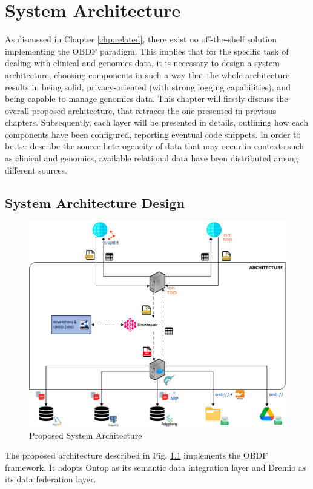 
\chapter{System Architecture}
\label{chp:architecture}

As discussed in Chapter \ref{chp:related}, there exist no off-the-shelf solution implementing the \ac{OBDF} paradigm. This implies that for the specific task of dealing with clinical and genomics data, it is necessary to design a system architecture, choosing components in such a way that the whole architecture results in being solid, privacy-oriented (with strong logging capabilities), and being capable to manage genomics data.
This chapter will firstly discuss the overall proposed architecture, that retraces the one presented in previous chapters. Subsequently, each layer will be presented in details, outlining how each components have been configured, reporting eventual code snippets. In order to better describe the source heterogeneity of data that may occur in contexts such as clinical and genomics, available relational data have been distributed among different sources.

\section{System Architecture Design}
\begin{figure}[ht]
    \centering
    \includegraphics[width=15cm]{res/Drawing1.png}
    \caption{Proposed System Architecture}
    \label{fig:mirco_arch}
\end{figure}
The proposed architecture described in Fig. \ref{fig:mirco_arch} implements the \ac{OBDF} framework. It adopts Ontop as its semantic data integration layer and Dremio as its data federation layer. 

